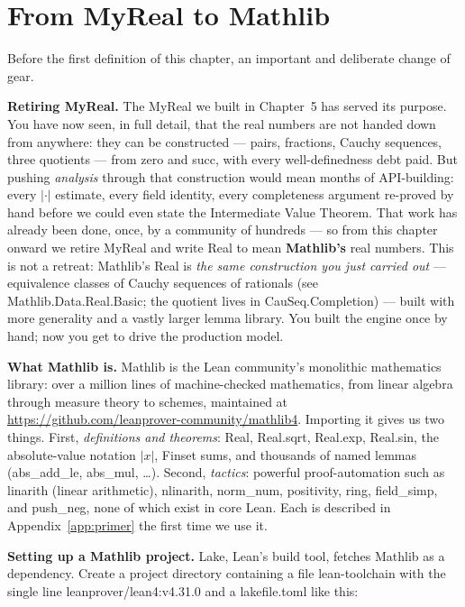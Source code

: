\documentclass[12pt, openany]{book}
\theoremstyle{plain}
\theoremstyle{definition}
\theoremstyle{remark}
\newcommand{\li}[1]{{\ttfamily\small\color{tealaccent}#1}}
\begin{document}
\section{From \texorpdfstring{\li{MyReal}}{MyReal} to Mathlib}\label{sec:mathlib-switch}

Before the first definition of this chapter, an important and deliberate change of gear.

\textbf{Retiring \li{MyReal}.}  The \li{MyReal} we built in Chapter~5 has served its purpose.  You have now seen, in full detail, that the real numbers are not handed down from anywhere: they can be constructed --- pairs, fractions, Cauchy sequences, three quotients --- from \li{zero} and \li{succ}, with every well-definedness debt paid.  But pushing \emph{analysis} through that construction would mean months of API-building: every $|{\cdot}|$ estimate, every field identity, every completeness argument re-proved by hand before we could even state the Intermediate Value Theorem.  That work has already been done, once, by a community of hundreds --- so from this chapter onward we retire \li{MyReal} and write \li{Real} to mean \textbf{Mathlib's} real numbers.  This is not a retreat: Mathlib's \li{Real} is \emph{the same construction you just carried out} --- equivalence classes of Cauchy sequences of rationals (see \li{Mathlib.Data.Real.Basic}; the quotient lives in \li{CauSeq.Completion}) --- built with more generality and a vastly larger lemma library.  You built the engine once by hand; now you get to drive the production model.

\textbf{What Mathlib is.}  Mathlib is the Lean community's monolithic mathematics library: over a million lines of machine-checked mathematics, from linear algebra through measure theory to schemes, maintained at \url{https://github.com/leanprover-community/mathlib4}.  Importing it gives us two things.  First, \emph{definitions and theorems}: \li{Real}, \li{Real.sqrt}, \li{Real.exp}, \li{Real.sin}, the absolute-value notation $|x|$, \li{Finset} sums, and thousands of named lemmas (\li{abs\_add\_le}, \li{abs\_mul}, \ldots).  Second, \emph{tactics}: powerful proof-automation such as \li{linarith} (linear arithmetic), \li{nlinarith}, \li{norm\_num}, \li{positivity}, \li{ring}, \li{field\_simp}, and \li{push\_neg}, none of which exist in core Lean.  Each is described in Appendix~\ref{app:primer} the first time we use it.

\textbf{Setting up a Mathlib project.}  Lake, Lean's build tool, fetches Mathlib as a dependency.  Create a project directory containing a file \li{lean-toolchain} with the single line \li{leanprover/lean4:v4.31.0} and a \li{lakefile.toml} like this:
\end{document}
